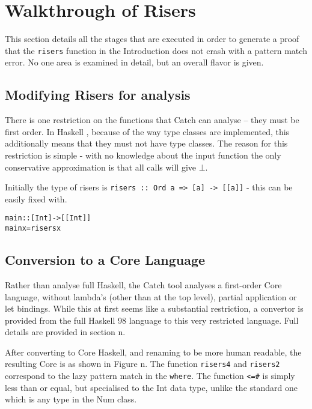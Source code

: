 \documentclass[preprint]{sigplanconf}
\newcommand{\T}[1]{\texttt{#1}}
\newenvironment{code}{\begin{alltt}\small}{\end{alltt}}
\begin{document}
\section{Walkthrough of Risers}

This section details all the stages that are executed in order to generate a proof that the \T{risers} function in the Introduction does not crash with a pattern match error. No one area is examined in detail, but an overall flavor is given.

\subsection{Modifying Risers for analysis}

There is one restriction on the functions that Catch can analyse -- they must be first order. In Haskell \citep{haskell}, because of the way type classes are implemented, this additionally means that they must not have type classes. The reason for this restriction is simple - with no knowledge about the input function the only conservative approximation is that all calls will give $\bot$.

Initially the type of risers is \T{risers :: Ord a => [a] -> [[a]]} - this can be easily fixed with.

\begin{code}
 main :: [Int] -> [[Int]]
 main x = risers x
\end{code}

\subsection{Conversion to a Core Language}

Rather than analyse full Haskell, the Catch tool analyses a first-order Core language, without lambda's (other than at the top level), partial application or let bindings. While this at first seems like a substantial restriction, a convertor is provided from the full Haskell 98 language to this very restricted language. Full details are provided in section n.

After converting to Core Haskell, and renaming to be more human readable, the resulting Core is as shown in Figure n. The function \T{risers4} and \T{risers2} correspond to the lazy pattern match in the \T{where}. The function \T{<=\#} is simply less than or equal, but specialised to the Int data type, unlike the standard one which is any type in the Num class.
\end{document}
